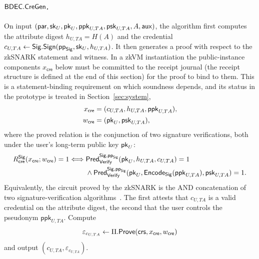 \begin{construction}
\paragraph{$\mathsf{BDEC}.\mathsf{CreGen}$.}
On input $(\mathsf{par},\mathsf{sk}_U,\mathsf{pk}_U,\mathsf{ppk}_{U,TA},\mathsf{psk}_{U,TA},A,\mathsf{aux})$, the algorithm first computes the attribute digest $h_{U,TA}=H(A)$ and the credential $c_{U,TA}\leftarrow\mathsf{Sig}.\mathsf{Sign}(\mathsf{pp}_{\mathsf{Sig}},\mathsf{sk}_U,h_{U,TA})$. It then generates a proof with respect to the zkSNARK statement and witness. In a zkVM instantiation the public-instance components $x_{\mathsf{cre}}$ below must be committed to the receipt journal (the receipt structure is defined at the end of this section) for the proof to bind to them. This is a statement-binding requirement on which soundness depends, and its status in the prototype is treated in Section~\ref{sec:system},
\begin{equation*}
\begin{aligned}
  x_{\mathsf{cre}} &=(c_{U,TA},h_{U,TA},\mathsf{ppk}_{U,TA}),\\
  w_{\mathsf{cre}} &=(\mathsf{pk}_U,\mathsf{psk}_{U,TA}),
\end{aligned}
\end{equation*}
where the proved relation is the conjunction of two signature verifications, both under the user's long-term public key $\mathsf{pk}_U$:
\begin{equation*}
\begin{aligned}
R_{\mathsf{cre}}^{\mathsf{Sig}}(x_{\mathsf{cre}};w_{\mathsf{cre}})=1
\Longleftrightarrow{}&
\mathsf{Pred}_{\mathsf{Verify}}^{\mathsf{Sig},\mathsf{pp}_{\mathsf{Sig}}}(\mathsf{pk}_U,h_{U,TA},c_{U,TA})=1\\
&\land
\mathsf{Pred}_{\mathsf{Verify}}^{\mathsf{Sig},\mathsf{pp}_{\mathsf{Sig}}}(\mathsf{pk}_U,\mathsf{Encode}_{\mathsf{Sig}}(\mathsf{ppk}_{U,TA}),\mathsf{psk}_{U,TA})=1.
\end{aligned}
\end{equation*}
Equivalently, the circuit proved by the zkSNARK is the AND concatenation of two signature-verification algorithms~\cite{10.1007/978-981-96-0957-4_3}. The first attests that $c_{U,TA}$ is a valid credential on the attribute digest, the second that the user controls the pseudonym $\mathsf{ppk}_{U,TA}$. Compute
\begin{equation*}
  \varepsilon_{c_{U,TA}}\leftarrow\Pi.\mathsf{Prove}(\mathsf{crs},x_{\mathsf{cre}},w_{\mathsf{cre}})
\end{equation*}
and output $(c_{U,TA},\varepsilon_{c_{U,TA}})$.


\end{construction}
